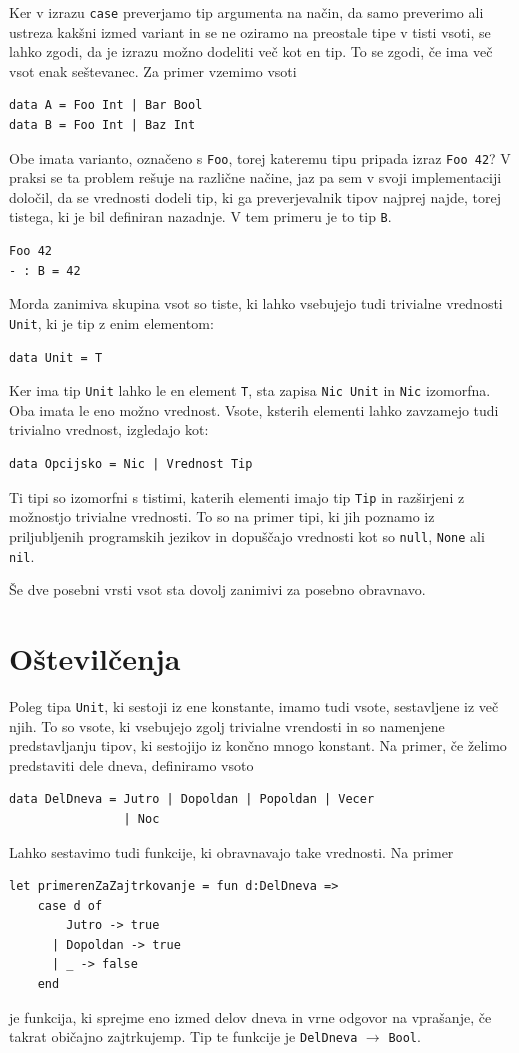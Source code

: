 \documentclass[a4paper,12pt,openright]{book}
\begin{document}
Ker v izrazu \lstinline{case} preverjamo tip argumenta na način, da samo preverimo ali ustreza kakšni izmed variant in se ne oziramo na preostale tipe v tisti vsoti, 
se lahko zgodi, da je izrazu možno dodeliti več kot en tip. To se zgodi, če ima več vsot enak seštevanec. Za primer vzemimo vsoti
\begin{lstlisting}
data A = Foo Int | Bar Bool
data B = Foo Int | Baz Int
\end{lstlisting}
Obe imata varianto, označeno s \lstinline{Foo}, torej kateremu tipu pripada izraz \lstinline{Foo 42}? V praksi se ta problem rešuje na različne načine, jaz pa sem v svoji implementaciji določil, da se vrednosti 
dodeli tip, ki ga preverjevalnik tipov najprej najde, torej tistega, ki je bil definiran nazadnje. V tem primeru je to tip \lstinline{B}.
\begin{lstlisting}
Foo 42
- : B = 42
\end{lstlisting}

Morda zanimiva skupina vsot so tiste, ki lahko vsebujejo tudi trivialne vrednosti \lstinline{Unit}, ki je tip z enim elementom:
\begin{lstlisting}
data Unit = T
\end{lstlisting}
Ker ima tip \lstinline{Unit} lahko le en element \lstinline{T}, sta zapisa \lstinline{Nic Unit} in \lstinline{Nic} izomorfna. Oba imata le eno možno vrednost. Vsote, ksterih elementi lahko zavzamejo tudi trivialno vrednost, izgledajo kot:
\begin{lstlisting}
data Opcijsko = Nic | Vrednost Tip
\end{lstlisting}
Ti tipi so izomorfni s tistimi, katerih elementi imajo tip \lstinline{Tip} in razširjeni z možnostjo trivialne vrednosti. To so na primer tipi, ki jih poznamo iz priljubljenih programskih jezikov in dopuščajo 
vrednosti kot so \lstinline{null}, \lstinline{None} ali \lstinline{nil}.

Še dve posebni vrsti vsot sta dovolj zanimivi za posebno obravnavo.

\section{Oštevilčenja}
Poleg tipa \lstinline{Unit}, ki sestoji iz ene konstante, imamo tudi vsote, sestavljene iz več njih. To so vsote, ki vsebujejo zgolj trivialne vrendosti in so namenjene predstavljanju tipov, ki sestojijo iz končno mnogo konstant. 
Na primer, če želimo predstaviti dele dneva, definiramo vsoto
\begin{lstlisting}
data DelDneva = Jutro | Dopoldan | Popoldan | Vecer 
                | Noc
\end{lstlisting}
Lahko sestavimo tudi funkcije, ki obravnavajo take vrednosti. Na primer
\begin{lstlisting}
let primerenZaZajtrkovanje = fun d:DelDneva =>
    case d of 
        Jutro -> true
      | Dopoldan -> true
      | _ -> false
    end
\end{lstlisting}
je funkcija, ki sprejme eno izmed delov dneva in vrne odgovor na vprašanje, če takrat običajno zajtrkujemp. Tip te funkcije je \lstinline{DelDneva} $\rightarrow$ \lstinline{Bool}.
\end{document}
